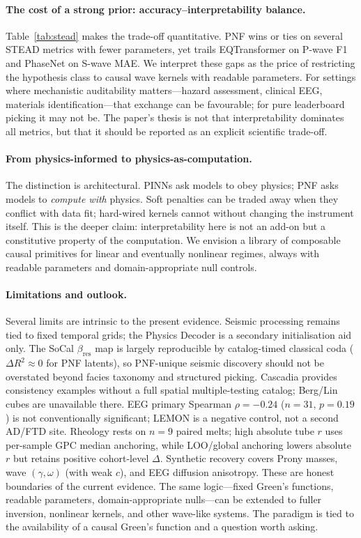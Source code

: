 \documentclass[twocolumn, 10pt]{article}
\newcommand{\pnf}{\textsc{PNF}}
\begin{document}
\paragraph{The cost of a strong prior: accuracy--interpretability balance.}
Table~\ref{tab:stead} makes the trade-off quantitative. \pnf{} wins or ties on several STEAD metrics with fewer parameters, yet trails EQTransformer on P-wave F1 and PhaseNet on S-wave MAE. We interpret these gaps as the price of restricting the hypothesis class to causal wave kernels with readable parameters. For settings where mechanistic auditability matters---hazard assessment, clinical EEG, materials identification---that exchange can be favourable; for pure leaderboard picking it may not be. The paper's thesis is not that interpretability dominates all metrics, but that it should be reported as an explicit scientific trade-off.

\paragraph{From physics-informed to physics-as-computation.}
The distinction is architectural. PINNs ask models to obey physics; PNF asks models to \emph{compute with} physics. Soft penalties can be traded away when they conflict with data fit; hard-wired kernels cannot without changing the instrument itself. This is the deeper claim: interpretability here is not an add-on but a constitutive property of the computation\cite{vinuesa2023,ilievski2025}. We envision a library of composable causal primitives for linear and eventually nonlinear regimes, always with readable parameters and domain-appropriate null controls\cite{berner2026,zhai2025}.

\paragraph{Limitations and outlook.}
Several limits are intrinsic to the present evidence. Seismic processing remains tied to fixed temporal grids; the Physics Decoder is a secondary initialisation aid only. The SoCal \(\beta_{\mathrm{res}}\) map is largely reproducible by catalog-timed classical coda (\(\Delta R^{2}\approx0\) for PNF latents), so PNF-unique seismic discovery should not be overstated beyond facies taxonomy and structured picking. Cascadia provides consistency examples without a full spatial multiple-testing catalog; Berg/Lin cubes are unavailable there. EEG primary Spearman \(\rho=-0.24\) (\(n=31\), \(p=0.19\)) is not conventionally significant; LEMON is a negative control, not a second AD/FTD site. Rheology rests on \(n=9\) paired melts; high absolute tube \(r\) uses per-sample GPC median anchoring, while LOO/global anchoring lowers absolute \(r\) but retains positive cohort-level \(\Delta\). Synthetic recovery covers Prony masses, wave \((\gamma,\omega)\) (with weak \(c\)), and EEG diffusion anisotropy. These are honest boundaries of the current evidence. The same logic---fixed Green's functions, readable parameters, domain-appropriate nulls---can be extended to fuller inversion, nonlinear kernels, and other wave-like systems\cite{huang2023,xiao2025}. The paradigm is tied to the availability of a causal Green's function and a question worth asking.
\end{document}
